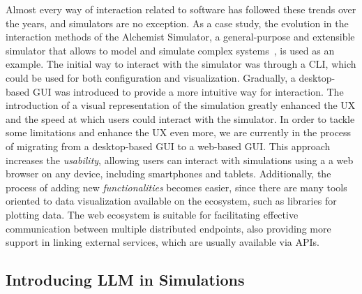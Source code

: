 \documentclass[conference]{IEEEtran}
\begin{document}
Almost every way of interaction related to software has followed these trends over the years,
and simulators are no exception.
%
As a case study,
the evolution in the interaction methods of the Alchemist Simulator,
a general-purpose and extensible simulator that allows to model and simulate complex systems~\cite{Pianini_2013},
is used as an example.
%
The initial way to interact with the simulator was through a \ac{CLI},
which could be used for both configuration and visualization.
%
Gradually,
a desktop-based \ac{GUI} was introduced to provide a more intuitive way for interaction.
%
The introduction of a visual representation of the simulation greatly enhanced the \ac{UX} and the speed at which users could interact with the simulator.
%
In order to tackle some limitations and enhance the \ac{UX} even more,
we are currently in the process of migrating from a desktop-based \ac{GUI} to a web-based \ac{GUI}.
%
This approach increases the \emph{usability},
allowing users can interact with simulations using a a web browser on any device,
including smartphones and tablets.
%
Additionally,
the process of adding new \emph{functionalities} becomes easier,
since there are many tools oriented to data visualization available on the ecosystem,
such as libraries for plotting data.
%
The web ecosystem is suitable for facilitating effective communication between multiple distributed endpoints,
also providing more support in linking external services,
which are usually available via \acp{API}.
%

\subsection{Introducing \ac{LLM} in Simulations}
\end{document}
